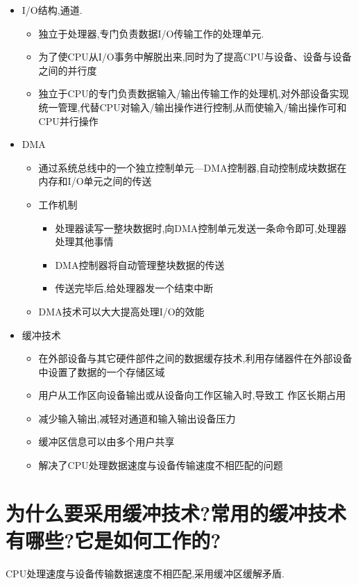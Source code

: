 \documentclass[a4paper,12pt,notitlepage]{article}
\begin{document}
\begin{itemize}
	\item I/O结构,通道.
	\begin{itemize}
		\item 独立于处理器,专门负责数据I/O传输工作的处理单元.
		\item 为了使CPU从I/O事务中解脱出来,同时为了提高CPU与设备、设备与设备之间的并行度 
		\item 独立于CPU的专门负责数据输入/输出传输工作的处理机,对外部设备实现统一管理,代替CPU对输入/输出操作进行控制,从而使输入/输出操作可和CPU并行操作
	\end{itemize}
	\item DMA
	\begin{itemize}
		\item 通过系统总线中的一个独立控制单元—DMA控制器,自动控制成块数据在内存和I/O单元之间的传送
		\item 工作机制
		\begin{itemize}
			\item 处理器读写一整块数据时,向DMA控制单元发送一条命令即可,处理器处理其他事情
			\item DMA控制器将自动管理整块数据的传送
			\item 传送完毕后,给处理器发一个结束中断
		\end{itemize}
		\item DMA技术可以大大提高处理I/O的效能
	\end{itemize}
	\item 缓冲技术
	\begin{itemize}
		\item 在外部设备与其它硬件部件之间的数据缓存技术,利用存储器件在外部设备中设置了数据的一个存储区域
		\item 用户从工作区向设备输出或从设备向工作区输入时,导致工
作区长期占用
		\item 减少输入输出,减轻对通道和输入输出设备压力
		\item 缓冲区信息可以由多个用户共享
		\item 解决了CPU处理数据速度与设备传输速度不相匹配的问题
	\end{itemize}
\end{itemize}
	
\section{为什么要采用缓冲技术?常用的缓冲技术有哪些?它是如何工作的?}

	CPU处理速度与设备传输数据速度不相匹配,采用缓冲区缓解矛盾. \\
	
\end{document}
